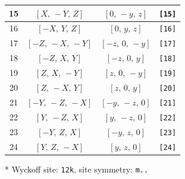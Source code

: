 \documentclass[fleqn,8pt]{jsarticle}
\begin{document}
\begin{longtable}{cccc}
15 & $\left[ X,\, - Y,\, Z \right]$ & $\left[ 0,\, - y,\, z \right]$ & {\tt [15]} \\ \hline
16 & $\left[ - X,\, Y,\, Z \right]$ & $\left[ 0,\, y,\, z \right]$ & {\tt [16]} \\ \hline
17 & $\left[ - Z,\, - X,\, - Y \right]$ & $\left[ - z,\, 0,\, - y \right]$ & {\tt [17]} \\ \hline
18 & $\left[ - Z,\, X,\, Y \right]$ & $\left[ - z,\, 0,\, y \right]$ & {\tt [18]} \\ \hline
19 & $\left[ Z,\, X,\, - Y \right]$ & $\left[ z,\, 0,\, - y \right]$ & {\tt [19]} \\ \hline
20 & $\left[ Z,\, - X,\, Y \right]$ & $\left[ z,\, 0,\, y \right]$ & {\tt [20]} \\ \hline
21 & $\left[ - Y,\, - Z,\, - X \right]$ & $\left[ - y,\, - z,\, 0 \right]$ & {\tt [21]} \\ \hline
22 & $\left[ Y,\, - Z,\, X \right]$ & $\left[ y,\, - z,\, 0 \right]$ & {\tt [22]} \\ \hline
23 & $\left[ - Y,\, Z,\, X \right]$ & $\left[ - y,\, z,\, 0 \right]$ & {\tt [23]} \\ \hline
24 & $\left[ Y,\, Z,\, - X \right]$ & $\left[ y,\, z,\, 0 \right]$ & {\tt [24]} \\
\end{longtable}
* Wyckoff site: {\tt 12k}, site symmetry: {\tt m..}
\renewcommand{\arraystretch}{1.2}
\end{document}
